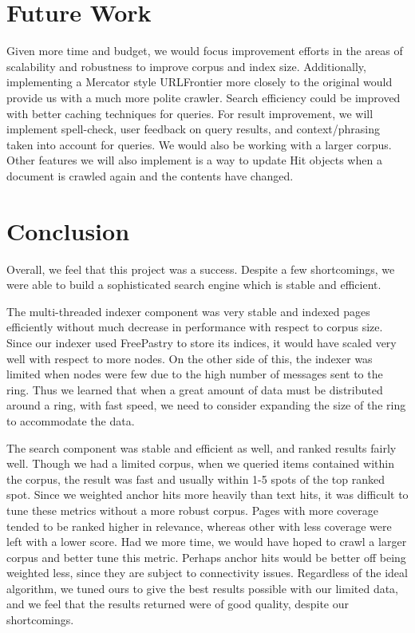\documentclass[11pt, letterpaper, oneside, twocolumn]{article}
\begin{document}
\section{Future Work}
\label{sec:future}

Given more time and budget, we would focus improvement efforts in the areas of scalability and robustness to improve corpus and index size.
Additionally, implementing a Mercator style URLFrontier more closely to the original would provide us with a much more polite crawler. 
Search efficiency could be improved with better caching techniques for queries.
For result improvement, we will implement spell-check, user feedback on query results, and context/phrasing taken into account for queries. 
We would also be working with a larger corpus.
Other features we will also implement is a way to update Hit objects when a document is crawled again and the contents have changed.


\section{Conclusion}
\label{sec:conculsion}
Overall, we feel that this project was a success.
Despite a few shortcomings, we were able to build a sophisticated search engine which is stable and efficient.

The multi-threaded indexer component was very stable and indexed pages efficiently without much decrease in performance with respect to corpus size.
Since our indexer used FreePastry to store its indices, it would have scaled very well with respect to more nodes.
On the other side of this, the indexer was limited when nodes were few due to the high number of messages sent to the ring.
Thus we learned that when a great amount of data must be distributed around a ring, with fast speed, we need to consider expanding the size of the ring to accommodate the data.

The search component was stable and efficient as well, and ranked results fairly well. 
Though we had a limited corpus, when we queried items contained within the corpus, the result was fast and usually within 1-5 spots of the top ranked spot. 
Since we weighted anchor hits more heavily than text hits, it was difficult to tune these metrics without a more robust corpus. 
Pages with more coverage tended to be ranked higher in relevance, whereas other with less coverage were left with a lower score. 
Had we more time, we would have hoped to crawl a larger corpus and better tune this metric. 
Perhaps anchor hits would be better off being weighted less, since they are subject to connectivity issues. 
Regardless of the ideal algorithm, we tuned ours to give the best results possible with our limited data, and we feel that the results returned were of good quality, despite our shortcomings.
\end{document}
